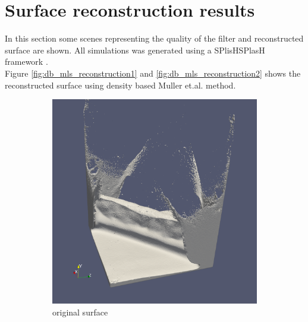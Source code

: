 \section{Surface reconstruction results}
In this section some scenes representing the quality of the filter and reconstructed surface are shown. All simulations was generated using a SPlisHSPlasH framework \cite{SPlisHSPlasH}.\\
Figure \ref{fig:db_mls_reconstruction1} and \ref{fig:db_mls_reconstruction2} shows the reconstructed surface using density based Muller et.al. method. 
\begin{figure}
	\begin{center}
		\begin{subfigure}[b]{0.47\textwidth}
			\includegraphics[width=\textwidth]{figures/DDMOriginal1.png}
			\caption{original surface}
		\end{subfigure}
		\begin{subfigure}[b]{0.47\textwidth}

\end{subfigure}
\end{center}
\end{figure}
